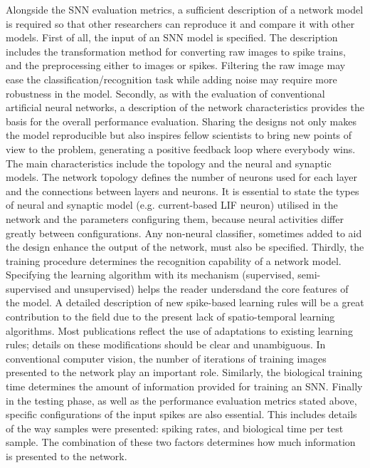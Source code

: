 \documentclass{frontiersENG} %
\begin{document}
Alongside the SNN evaluation metrics, a sufficient description of a network model is required so that other researchers can reproduce it and compare it with other models.
First of all, the input of an SNN model is specified.
The description includes the transformation method for converting raw images to spike trains, and the preprocessing either to images or spikes.
Filtering the raw image may ease the classification/recognition task while adding noise may require more robustness in the model.
Secondly, as with the evaluation of conventional artificial neural networks, a description of the network characteristics provides the basis for the overall performance evaluation.
Sharing the designs not only makes the model reproducible but also inspires fellow scientists to bring new points of view to the problem, generating a positive feedback loop where everybody wins.
The main characteristics include the topology and the neural and synaptic models.
The network topology defines the number of neurons used for each layer and the connections between layers and neurons.
It is essential to state the types of neural and synaptic model (e.g. current-based LIF neuron) utilised in the network and the parameters configuring them, because neural activities differ greatly between configurations.
Any non-neural classifier, sometimes added to aid the design enhance the output of the network, must also be specified.
Thirdly, the training procedure determines the recognition capability of a network model.
Specifying the learning algorithm with its mechanism (supervised, semi-supervised and unsupervised) helps the reader undersdand the core features of the model.
A detailed description of new spike-based learning rules will be a great contribution to the field due to the present lack of spatio-temporal learning algorithms.
Most publications reflect the use of adaptations to existing learning rules; details on these modifications should be clear and unambiguous.
In conventional computer vision, the number of iterations of training images presented to the network play an important role.
Similarly, the biological training time determines the amount of information provided for training an SNN.
Finally in the testing phase, as well as the performance evaluation metrics stated above, specific configurations of the input spikes are also essential.
This includes details of the way samples were presented: spiking rates, and biological time per test sample.
The combination of these two factors determines how much information is presented to the network.
\end{document}
